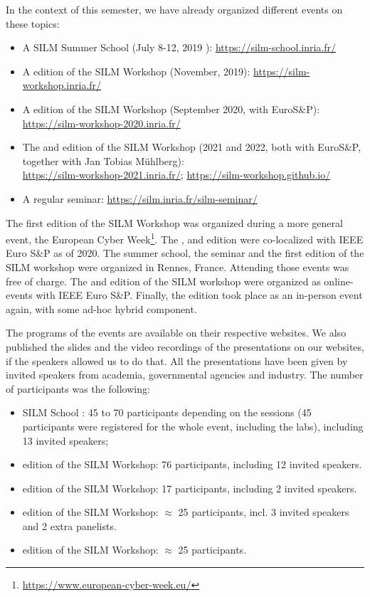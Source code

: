 \documentclass[a4paper,11pt]{article} %
\numberwithin{equation}{section} %
\numberwithin{figure}{section} %
\numberwithin{table}{section} %
\begin{document}
In the context of this semester, we have already organized different events
on these topics:
%
\begin{itemize}
%
    \item A SILM Summer School (July 8-12, 2019 ):
\url{https://silm-school.inria.fr/}
%
    \item A  edition of the SILM Workshop (November, 2019):
\url{https://silm-workshop.inria.fr/}
%
    \item A  edition of the SILM Workshop (September 2020, with
EuroS\&P): \\
\url{https://silm-workshop-2020.inria.fr/}
%
    \item The  and  edition of the SILM Workshop (2021 and 2022, both with
EuroS\&P, together
with Jan Tobias M\"uhlberg): \\
\url{https://silm-workshop-2021.inria.fr/};
\url{https://silm-workshop.github.io/}
%
    \item A regular seminar: \url{https://silm.inria.fr/silm-seminar/}
%
\end{itemize}

The first edition of the SILM Workshop was organized during a more general
event, the European Cyber Week\footnote{\url{https://www.european-cyber-week.eu/}}.
The ,  and  edition were co-localized with IEEE Euro S\&P as of 2020. 
% 
The summer school, the seminar and the first edition of the SILM workshop
were organized in Rennes, France. Attending those events was free of
charge. The  and  edition of the SILM workshop were organized as
online-events with IEEE Euro S\&P. Finally, the  edition took place as an in-person event again, with some ad-hoc hybrid component.

The programs of the events are available on their respective websites. We
also published the slides and the video recordings of the presentations on
our websites, if the speakers allowed us to do that. All the presentations
have been given by invited speakers from academia, governmental agencies
and industry. The number of participants was the following:
%
\begin{itemize}
%
    \item SILM School : 45 to 70 participants depending on the sessions (45
participants were registered for the whole event, including the labs),
including 13 invited speakers;
%
    \item {} edition of the SILM Workshop: 76 participants, including
12 invited speakers.
%
    \item {} edition of the SILM Workshop: 17 participants, including
2 invited speakers.
%
    \item {} edition of the SILM Workshop: $\approx$ 25 participants,
incl. 3 invited speakers and 2 extra panelists.
%
    \item {} edition of the SILM Workshop: $\approx$ 25 participants.
%
\end{itemize}
\end{document}
